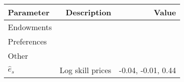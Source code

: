 \begin{tabular}{lrr}
\hline
Parameter & Description  & Value  \\
\hline
Endowments &   &   \\
Preferences &   &   \\
Other &   &   \\
$\hat{e}_{s}$ & Log skill prices  & -0.04, -0.01, 0.44  \\
\hline
\end{tabular}%
